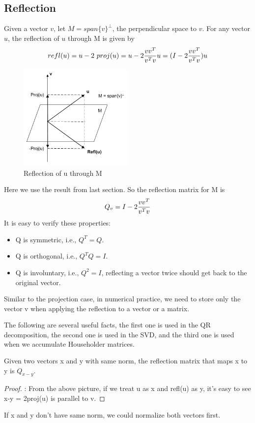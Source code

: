 \subsection{Reflection}
Given a vector $v$, let $M = span\bigl\{v\bigr\}^\bot$, the perpendicular space to $v$. For any vector $u$, the reflection of $u$ through M is given by
\[refl(u) = u - 2\ proj(u) = u - 2 {{vv^T} \over {v^Tv}}u =
(I - 2{{vv^T} \over {v^Tv}})u\]
\begin{figure}[htp]
\centerline{
\includegraphics[bb=20 0 200 250,width=0.5\textwidth] {chap4/reflection.png}
}
\caption{Reflection of u through M}
\label{figure:reflection}
\end{figure}
Here we use the result from last section. So the reflection matrix for M is 
\begin{equation}
Q_v = I - 2{{vv^T} \over {v^Tv}}
\end{equation}
It is easy to verify these properties:
\begin{itemize}
\item Q is symmetric, i.e., $Q^T = Q$.
\item Q is orthogonal, i.e., $Q^TQ = I$.
\item Q is involuntary, i.e., $Q^2 = I$, reflecting a vector twice should get back to the original vector.
\end{itemize}
Similar to the projection case, in numerical practice, we need to store only the vector v when applying the reflection to a vector or a matrix.

The following are several useful facts, the first one is used in the QR decomposition, the second one is used in the SVD, and the third one is used when we accumulate Householder matrices.

\begin{lem}
Given two vectors x and y with same norm, the reflection matrix that maps x to y is $Q_{x-y}$.
\end{lem}
\begin{proof}: From the above picture, if we treat u as x and refl(u) as y, it's easy to see x-y = 2proj(u) is parallel to v.
\end{proof}
If x and y don't have same norm, we could normalize both vectors first.

